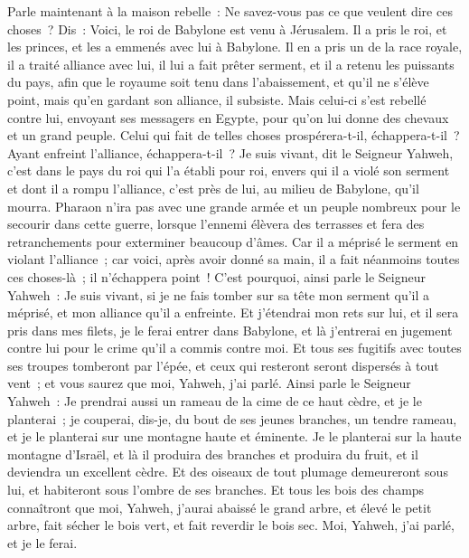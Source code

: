 \begin{multicols}{2}
Parle maintenant à la maison rebelle~: Ne savez-vous pas ce que veulent dire ces choses~? Dis~: Voici, le roi de Babylone est venu à Jérusalem. Il a pris le roi, et les princes, et les a emmenés avec lui à Babylone.
Il en a pris un de la race royale, il a traité alliance avec lui, il lui a fait prêter serment, et il a retenu les puissants du pays,
afin que le royaume soit tenu dans l'abaissement, et qu'il ne s'élève point, mais qu'en gardant son alliance, il subsiste.
Mais celui-ci s'est rebellé contre lui, envoyant ses messagers en Egypte, pour qu'on lui donne des chevaux et un grand peuple. Celui qui fait de telles choses prospérera-t-il, échappera-t-il~? Ayant enfreint l'alliance, échappera-t-il~?
Je suis vivant, dit le Seigneur Yahweh, c'est dans le pays du roi qui l'a établi pour roi, envers qui il a violé son serment et dont il a rompu l'alliance, c'est près de lui, au milieu de Babylone, qu'il mourra.
Pharaon n'ira pas avec une grande armée et un peuple nombreux pour le secourir dans cette guerre, lorsque l'ennemi élèvera des terrasses et fera des retranchements pour exterminer beaucoup d'âmes.
Car il a méprisé le serment en violant l'alliance~; car voici, après avoir donné sa main, il a fait néanmoins toutes ces choses-là~; il n'échappera point~!
C'est pourquoi, ainsi parle le Seigneur Yahweh~: Je suis vivant, si je ne fais tomber sur sa tête mon serment qu'il a méprisé, et mon alliance qu'il a enfreinte.
Et j'étendrai mon rets sur lui, et il sera pris dans mes filets, je le ferai entrer dans Babylone, et là j'entrerai en jugement contre lui pour le crime qu'il a commis contre moi.
Et tous ses fugitifs avec toutes ses troupes tomberont par l'épée, et ceux qui resteront seront dispersés à tout vent~; et vous saurez que moi, Yahweh, j'ai parlé.
Ainsi parle le Seigneur Yahweh~: Je prendrai aussi un rameau de la cime de ce haut cèdre, et je le planterai~; je couperai, dis-je, du bout de ses jeunes branches, un tendre rameau, et je le planterai sur une montagne haute et éminente.
Je le planterai sur la haute montagne d'Israël, et là il produira des branches et produira du fruit, et il deviendra un excellent cèdre. Et des oiseaux de tout plumage demeureront sous lui, et habiteront sous l'ombre de ses branches.
Et tous les bois des champs connaîtront que moi, Yahweh, j'aurai abaissé le grand arbre, et élevé le petit arbre, fait sécher le bois vert, et fait reverdir le bois sec. Moi, Yahweh, j'ai parlé, et je le ferai.

\end{multicols}
